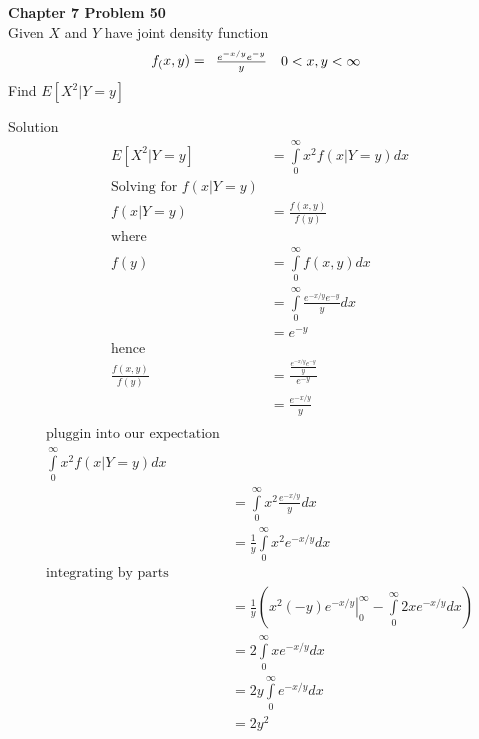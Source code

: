 \documentclass{article}
\begin{document}
\begin{spacing}{1.1}
\newpage
\begin{homeworkProblem}
  {\bf Chapter 7 Problem 50}\\
  Given $X$ and $Y$ have joint density function
  \[
    f_( x, y) = \begin{array}{l l}
      \frac{ e^{-x/y} e^{-y}}{ y} & 0 < x,y < \infty\\
    \end{array}
  \]
  Find $E[ X^2|Y = y]$
  \begin{homeworkSection}{Solution}
    \begin{align*}
      E[ X^2|Y = y]
        &= \int\limits_0^\infty x^2 f(x | Y = y) dx\\
      \text{Solving for $f(x | Y = y)$}\\
      f(x | Y = y) 
        &= \frac{ f( x, y)}{ f( y)}\\
        \text{where}\\
        f( y) &= \int\limits_0^\infty f( x, y) dx\\
        &= \int\limits_0^\infty \frac{ e^{-x/y} e^{-y}}{ y} dx\\
        &= e^{-y}\\
        \text{hence}\\
      \frac{ f( x, y)}{ f( y)}
        &= \frac{ \frac{ e^{-x/y} e^{-y}}{ y}}{ e^{-y}}\\
        &= \frac{ e^{-x/y}}{ y}\\
    \end{align*}
    \begin{align*}
      \text{pluggin into our expectation}\\
      \int\limits_0^\infty x^2 f(x | Y = y) dx\\
      &= \int\limits_0^\infty x^2 \frac{ e^{-x/y}}{ y} dx\\
      &= \frac{ 1}{ y} \int\limits_0^\infty x^2 e^{-x/y} dx\\
      \text{integrating by parts}\\
      &= \frac{ 1}{ y}\left( \left.x^2(-y)e^{-x/y}\right|_0^\infty - \int\limits_0^\infty 2x e^{-x/y} dx\right)\\
      &= 2 \int\limits_0^\infty x e^{-x/y} dx\\
      &= 2y \int\limits_0^\infty e^{-x/y} dx\\
      &= 2y^2
    \end{align*}
  \end{homeworkSection}
\end{homeworkProblem}


\end{spacing}
\end{document}
